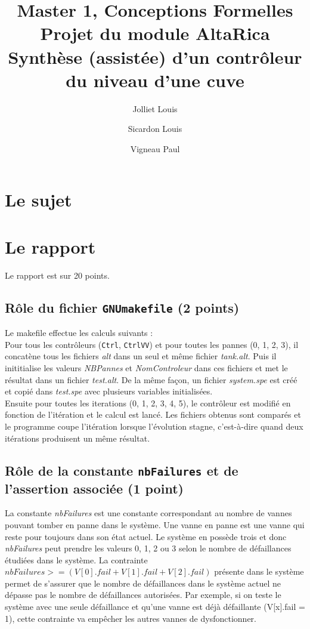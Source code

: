 \documentclass[a4paper]{book}
\newcommand{\altarica}{{\sc AltaRica}}
\begin{document}
\title{Master 1, Conceptions Formelles\\
Projet du module \altarica\\
Synthèse (assistée) d'un contrôleur du niveau d'une cuve}

\date{}

\author{Jolliet Louis \and Sicardon Louis \and Vigneau Paul}

\maketitle

\chapter{Le sujet}


\chapter{Le rapport}
Le rapport est sur 20 points.

\section{Rôle du fichier {\tt GNUmakefile} (2 points)}
Le makefile effectue les calculs suivants : \\
Pour tous les contrôleurs ({\tt Ctrl}, {\tt CtrlVV}) et  pour toutes les pannes (0, 1, 2, 3), il concatène tous les fichiers \textit{alt} dans un seul et même fichier \textit{tank.alt}.
Puis il inititialise les valeurs \textit{NBPannes} et \textit{NomControleur} dans ces fichiers et met le résultat dans un fichier \textit{test.alt}.
De la même façon, un fichier  \textit{system.spe} est créé et copié dans  \textit{test.spe} avec plusieurs variables initialisées. \\
Ensuite pour toutes les iterations (0, 1, 2, 3, 4, 5), le contrôleur est modifié en fonction de l'itération et le calcul est lancé.
Les fichiers obtenus sont comparés et le programme coupe l'itération lorsque l'évolution stagne, c'est-à-dire quand deux itérations produisent un même résultat.

\section{Rôle de la constante {\tt nbFailures} et de l'assertion associée (1 point)}
La constante \textit{nbFailures} est une constante correspondant au nombre de vannes pouvant tomber en panne dans le système. 
Une vanne en panne est une vanne qui reste pour toujours dans son état actuel. Le système en possède trois et donc \textit{nbFailures} 
peut prendre les valeurs 0, 1, 2 ou 3 selon le nombre de défaillances étudiées dans le système. La contrainte 
$nbFailures >= (V [0].fail + V [1].fail + V [2].fail)$ présente dans le système permet de s’assurer que le nombre de 
défaillances dans le système actuel ne dépasse pas le nombre de défaillances autorisées. Par exemple, si on teste le système 
avec une seule défaillance et qu'une vanne est déjà défaillante (V[x].fail = 1), cette contrainte va empêcher les autres vannes 
de dysfonctionner. 
\end{document}
